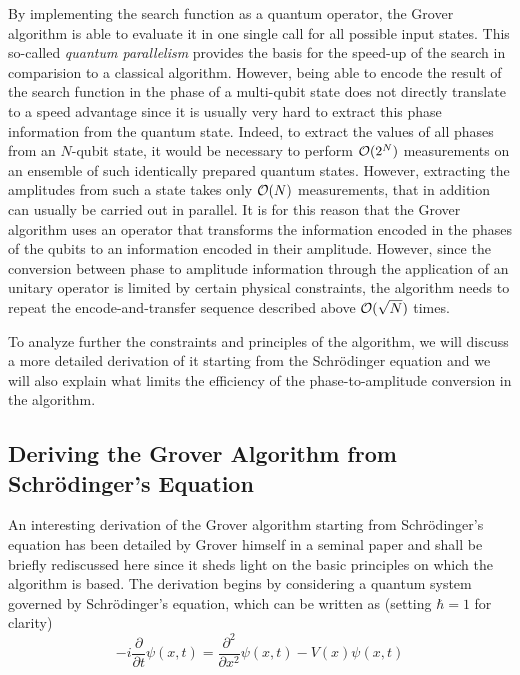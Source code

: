 By implementing the search function as a quantum operator, the Grover algorithm is able to evaluate it in one single call for all possible input states. This so-called {\it quantum parallelism} provides the basis for the speed-up of the search in comparision to a classical algorithm. However, being able to encode the result of the search function in the phase of a multi-qubit state does not directly translate to a speed advantage since it is usually very hard to extract this phase information from the quantum state. Indeed, to extract the values of all phases from an $N$-qubit state, it would be necessary to perform $\begin{mathcal}O(2^N)\end{mathcal}$ measurements on an ensemble of such identically prepared quantum states. However, extracting the amplitudes from such a state takes only $\begin{mathcal}O\end{mathcal}(N)$ measurements, that in addition can usually be carried out in parallel. It is for this reason that the Grover algorithm uses an operator that transforms the information encoded in the phases of the qubits to an information encoded in their amplitude. However, since the conversion between phase to amplitude information through the application of an unitary operator is limited by certain physical constraints, the algorithm needs to repeat the encode-and-transfer sequence described above $\begin{mathcal}O(\sqrt{N})\end{mathcal}$ times. \cite{lloyd_quantum_1999,meyer_sophisticated_2000,lanyon_experimental_2008,ahn_information_2000,ding_review_2007,linden_good_2001,braunstein_speed-up_2002}

\smallskip

To analyze further the constraints and principles of the algorithm, we will discuss a more detailed derivation of it starting from the Schrödinger equation and we will also explain what limits the efficiency of the phase-to-amplitude conversion in the algorithm.

\subsection{Deriving the Grover Algorithm from Schrödinger's Equation}


An interesting derivation of the Grover algorithm starting from Schrödinger's equation has been detailed by Grover himself in a seminal paper \citep{grover_schrodingers_2001} and shall be briefly rediscussed here since it sheds light on the basic principles on which the algorithm is based. The derivation begins by considering a quantum system governed by Schrödinger's equation, which can be written as (setting $\hbar = 1$ for clarity)
%
\begin{equation}
-i\frac{\partial}{\partial t}\psi(x,t) = \frac{\partial^2}{\partial x^2}\psi(x,t)-V(x)\psi(x,t) \label{eq:grover_derivation}
\end{equation}
%

